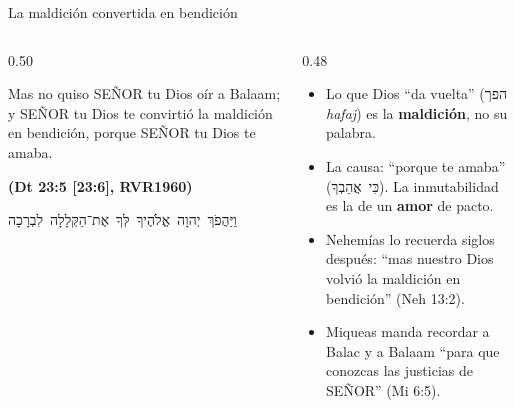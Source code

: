 \documentclass[hyperref={bookmarks=false},aspectratio=169]{beamer}
\newcommand{\heb}[1]{\mbox{\foreignlanguage{hebrew}{#1}}}
\newcommand{\SENOR}{S{\fontsize{0.78em}{1em}\selectfont EÑOR}}
\newcommand{\fuente}[1]{\par\hfill{\upshape\bfseries\footnotesize\textcolor{azul}{#1}}}
\newcommand{\destacar}[1]{\textbf{\textcolor{azul}{#1}}}
\begin{document}
\begin{frame}{La maldición convertida en bendición}
\begin{columns}[t,onlytextwidth]
\begin{column}{0.50\textwidth}
\begin{cita}Mas no quiso \SENOR{} tu Dios oír a Balaam; y \SENOR{} tu Dios te convirtió la maldición en bendición, porque \SENOR{} tu Dios te amaba.\fuente{(Dt 23:5 [23:6], RVR1960)}\end{cita}
\begin{center}\heb{וַיַּהֲפֹךְ יְהוָה אֱלֹהֶיךָ לְּךָ אֶת־הַקְּלָלָה לִבְרָכָה}\end{center}
\end{column}
\begin{column}{0.48\textwidth}\small
\begin{itemize}
\item Lo que Dios ``da vuelta'' (\heb{הפך} \emph{hafaj}) es la \destacar{maldición}, no su palabra.
\item La causa: ``porque te amaba'' (\heb{כִּי אֲהֵבְךָ}). La inmutabilidad es la de un \destacar{amor} de pacto.
\item Nehemías lo recuerda siglos después: ``mas nuestro Dios volvió la maldición en bendición'' (Neh 13:2).
\item Miqueas manda recordar a Balac y a Balaam ``para que conozcas las justicias de \SENOR'' (Mi 6:5).
\end{itemize}
\end{column}
\end{columns}
\end{frame}
\end{document}
